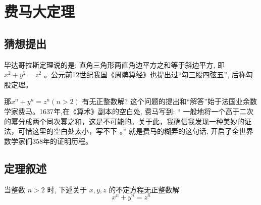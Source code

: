 \documentclass[main]{subfiles}
\begin{document}
\renewcommand{\filename}{费马大定理}%
\section{费马大定理}
\subsection{猜想提出}
毕达哥拉斯定理说的是: 直角三角形两直角边平方之和等于斜边平方, 即$x^2+y^2=z^2$ 。公元前12世纪我国《周髀算经》也提出过“勾三股四弦五”, 后称勾股定理。
\par 那$x^n+y^n=z^n (n > 2)$ 有无正整数解? 这个问题的提出和“解答”始于法国业余数学家费马。1637年,在《算术》副本的空白处, 费马写到: “ 一般地将一个高于二次的幂分成两个同次幂之和，这是不可能的。关于此，我确信我发现一种美妙的证法，可惜这里的空白处太小，写不下 。” 
就是费马的糊弄的这句话, 开启了全世界数学家们358年的证明历程。

\begin{figure}[H]
	\centering
\end{figure}
\subsection{定理叙述}
\begin{theorem}[费马大定理]
当整数 $ n>2$ 时, 下述关于 $x,y,z$ 的不定方程无正整数解
\[ x^n + y^n = z^n\]
\end{theorem}
\end{document}
